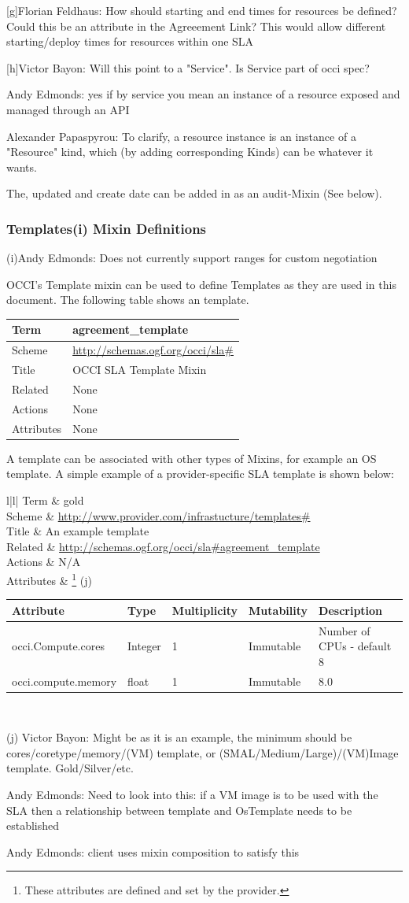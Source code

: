 \documentclass[12pt]{article}  %
\newcommand{\occitemplate}[6]{
\begin{tabular}{l|l|} \hline
Term	&	#1 \\ \hline 
Scheme	&	#2 \\ \hline
Title	& 	#3 \\ \hline
Related &	#4 \\ \hline
Actions & 	#5 \\ \hline
Attributes & #6 \\ \hline
\end{tabular}
}
\begin{document}
{
\color{blue}
[g]Florian Feldhaus:
How should starting and end times for resources be defined? Could this be an attribute in the Agreeement Link? This would allow different starting/deploy times for resources within one SLA

[h]Victor Bayon:
Will this point to a "Service". Is Service part of occi spec?

Andy Edmonds:
yes if by service you mean an instance of a resource exposed and managed through an API

Alexander Papaspyrou:
To clarify, a resource instance is an instance of a "Resource" kind, which (by adding corresponding Kinds) can be whatever it wants.
}

The, updated and create date can be added in as an audit-Mixin (See below).

\subsubsection{Templates(i) Mixin Definitions}

{
\color{blue}
(i)Andy Edmonds:
Does not currently support ranges for custom negotiation
}

OCCI’s Template mixin can be used to define Templates as they are used in this document. The following table shows an template.

\occitemplate
{agreement\_template}
{\url{http://schemas.ogf.org/occi/sla\#}}
{OCCI SLA Template Mixin}
{None}
{None}
{None}

A template can be associated with other types of Mixins, for example an OS template. A simple example of a provider-specific SLA template is shown below:

\occitemplate
{gold}
{\url{http://www.provider.com/infrastucture/templates\#}}
{An example template}
{\url{http://schemas.ogf.org/occi/sla\#agreement_template}}
{N/A}
{\footnote{These attributes are defined and set by the provider.} (j)
\begin{tabular}{|l|l|l|l|l|} \hline
Attribute & Type & Multiplicity	& Mutability & Description \\ \hline 
occi.Compute.cores & Integer & 1 & Immutable & \parbox[t]{1in}{Number of CPUs - default 8}  \\ \hline
occi.compute.memory & float & 1 & Immutable & 8.0 \\ \hline
\end{tabular}}

{
\color{blue}
(j) Victor Bayon:
Might be as it is an example, the minimum should be cores/coretype/memory/(VM) template, or (SMAL/Medium/Large)/(VM)Image template. Gold/Silver/etc.

Andy Edmonds:
Need to look into this: if a VM image is to be used with the SLA then a relationship between template and OsTemplate needs to be established

Andy Edmonds:
client uses mixin composition to satisfy this
}
\end{document}
